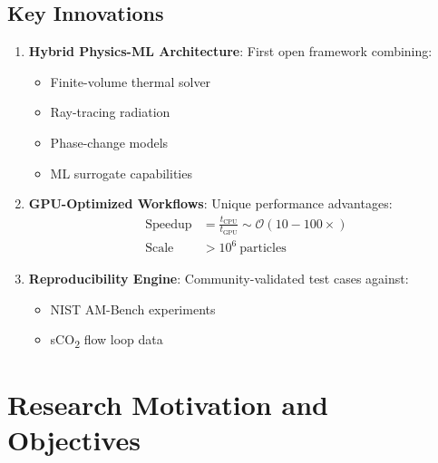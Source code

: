 \documentclass[11pt]{article}
\begin{document}
\subsection{Key Innovations}
\begin{enumerate}
    \item \textbf{Hybrid Physics-ML Architecture}: First open framework combining:
    \begin{itemize}
        \item Finite-volume thermal solver
        \item Ray-tracing radiation
        \item Phase-change models
        \item ML surrogate capabilities
    \end{itemize}
    
    \item \textbf{GPU-Optimized Workflows}: Unique performance advantages:
    \begin{align*}
    \text{Speedup} &= \frac{t_{\text{CPU}}}{t_{\text{GPU}}} \sim \mathcal{O}(10-100\times) \\
    \text{Scale}   &> 10^6\ \text{particles}
    \end{align*}
    
    \item \textbf{Reproducibility Engine}: Community-validated test cases against:
    \begin{itemize}
        \item NIST AM-Bench experiments
        \item sCO\textsubscript{2} flow loop data
    \end{itemize}
\end{enumerate}

\section{Research Motivation and Objectives}
\label{sec:intro}
\end{document}
